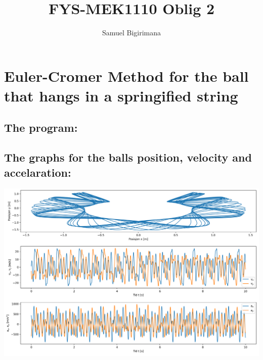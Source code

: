 \documentclass{article}
\title{FYS-MEK1110 Oblig 2}
\author{Samuel Bigirimana}
\begin{document}
    \maketitle
    \section*{Euler-Cromer Method for the ball that hangs in a springified string}

        \subsection*{The program: }
            
            \clearpage
        
        \subsection*{The graphs for the balls position, velocity and accelaration:}
            \includegraphics[width=1.2\textwidth,left]{../../graphs/springball.png}

            \clearpage
\end{document}
